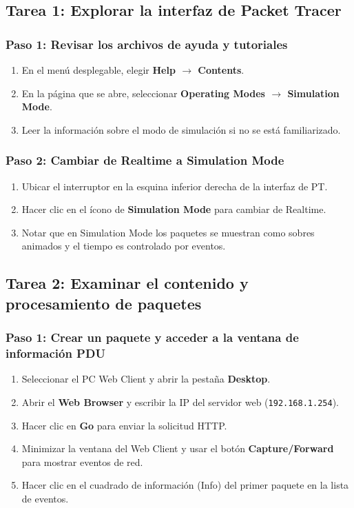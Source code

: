 \documentclass[a4paper,11pt]{article}
\begin{document}
\subsection{Tarea 1: Explorar la interfaz de Packet Tracer}

\subsubsection{Paso 1: Revisar los archivos de ayuda y tutoriales}
\begin{enumerate}[label=\alph*.]
    \item En el menú desplegable, elegir \textbf{Help $\rightarrow$ Contents}.
    \item En la página que se abre, seleccionar \textbf{Operating Modes $\rightarrow$ Simulation Mode}.
    \item Leer la información sobre el modo de simulación si no se está familiarizado.
\end{enumerate}

\subsubsection{Paso 2: Cambiar de Realtime a Simulation Mode}
\begin{enumerate}[label=\alph*.]
    \item Ubicar el interruptor en la esquina inferior derecha de la interfaz de PT.
    \item Hacer clic en el ícono de \textbf{Simulation Mode} para cambiar de Realtime.
    \item Notar que en Simulation Mode los paquetes se muestran como sobres animados y el tiempo es controlado por eventos.
\end{enumerate}

\subsection{Tarea 2: Examinar el contenido y procesamiento de paquetes}

\subsubsection{Paso 1: Crear un paquete y acceder a la ventana de información PDU}
\begin{enumerate}[label=\alph*.]
    \item Seleccionar el PC Web Client y abrir la pestaña \textbf{Desktop}.
    \item Abrir el \textbf{Web Browser} y escribir la IP del servidor web (\texttt{192.168.1.254}).
    \item Hacer clic en \textbf{Go} para enviar la solicitud HTTP.
    \item Minimizar la ventana del Web Client y usar el botón \textbf{Capture/Forward} para mostrar eventos de red.
    \item Hacer clic en el cuadrado de información (Info) del primer paquete en la lista de eventos.
\end{enumerate}
\end{document}
